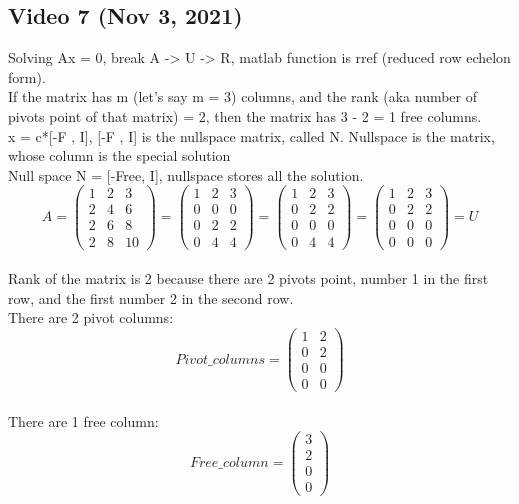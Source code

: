 \subsection{Video 7 (Nov 3, 2021)}

Solving Ax = 0, break A -> U -> R, matlab function is rref (reduced row echelon form).
\\If the matrix has m (let's say m = 3) columns, and the rank (aka number of pivots point of that matrix) = 2, then the matrix has 3 - 2 = 1 free columns.
\\x = c*[-F , I], [-F , I] is the nullspace matrix, called N. Nullspace is the matrix, whose column is the special solution
\\Null space N = [-Free, I], nullspace stores all the solution.
\begin{equation}
A = 
\left({\begin{array}{ccc} 1 & 2 & 3 \\ 2 & 4 & 6 \\ 2 & 6 & 8 \\ 2 & 8 & 10 \end{array}}\right)=
\left({\begin{array}{ccc} 1 & 2 & 3 \\ 0 & 0 & 0 \\ 0 & 2 & 2 \\ 0 & 4 & 4 \end{array}}\right)=
\left({\begin{array}{ccc} 1 & 2 & 3 \\ 0 & 2 & 2 \\ 0 & 0 & 0  \\ 0 & 4 & 4 \end{array}}\right)=
\left({\begin{array}{ccc} 1 & 2 & 3 \\ 0 & 2 & 2 \\ 0 & 0 & 0  \\ 0 & 0 & 0 \end{array}}\right)
= U
\end{equation}
\\Rank of the matrix is 2 because there are 2 pivots point, number 1 in the first row, and the first number 2 in the second row.
\\There are 2 pivot columns:
\begin{equation}
Pivot\_columns = 
\left({\begin{array}{cc} 1 & 2 \\ 0 & 2 \\ 0 & 0 \\ 0 & 0 \end{array}}\right)
\end{equation}
\\There are 1 free column: 
\begin{equation}
Free\_column = 
\left({\begin{array}{cc} 3 \\ 2 \\ 0 \\ 0 \end{array}}\right)
\end{equation}


